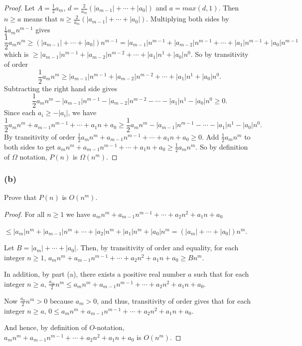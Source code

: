 \documentclass[14pt]{extarticle}
\newcommand{\dps}{\displaystyle}
\begin{document}
\begin{proof}
Let \(\dps A = \frac{1}{2}a_m\), \(\dps d = \frac{2}{a_m}(|a_{m-1}| + \cdots + |a_0|)\) and \(a = max(d, 1)\). Then 
\(n \geq a\) means that \(\dps n \geq \frac{2}{a_m}(|a_{m-1}| + \cdots + |a_0|)\). Multiplying both sides by \(\dps
\frac{1}{2}a_m n^{m-1}\) gives
\[
\frac{1}{2}a_m n^m \geq (|a_{m-1}| + \cdots + |a_0|)n^{m-1} = |a_{m-1}|n^{m-1} + |a_{m-2}|n^{m-1} + \cdots + |a_1|n^{m-1} +
|a_0|n^{m-1}
\]
which is \(\geq |a_{m-1}|n^{m-1} + |a_{m-2}|n^{m-2} + \cdots + |a_1|n^1 + |a_0|n^0\). So by transitivity of order
\[
\frac{1}{2}a_m n^m \geq |a_{m-1}|n^{m-1} + |a_{m-2}|n^{m-2} + \cdots + |a_1|n^1 + |a_0|n^0.
\]
Subtracting the right hand side gives
\[
\frac{1}{2}a_m n^m - |a_{m-1}|n^{m-1} - |a_{m-2}|n^{m-2} - \cdots - |a_1|n^1 - |a_0|n^0 \geq 0.
\]
Since each \(a_i \geq -|a_i|\), we have
\[
\frac{1}{2}a_m n^m + a_{m-1}n^{m-1} + \cdots + a_1n + a_0 \geq \frac{1}{2}a_m n^m - |a_{m-1}|n^{m-1} - \cdots - |a_1|n^1 - 
|a_0|n^0.
\]
By transitivity of order \(\frac{1}{2}a_m n^m + a_{m-1}n^{m-1} + \cdots + a_1n + a_0 \geq 0\). Add \(\frac{1}{2}a_mn^m\) to
both sides to get \(a_m n^m + a_{m-1}n^{m-1} + \cdots + a_1n + a_0 \geq \frac{1}{2}a_mn^m\). So by definition of \(\Omega\)
notation, \(P(n)\) is \(\Omega(n^m)\).
\end{proof}

\subsubsection{(b)}
Prove that \(P(n)\) is \(O(n^m)\).
\begin{proof}
For all \(n \geq 1\) we have \(a_mn^m + a_{m-1}n^{m-1} + \cdots + a_2n^2 + a_1n + a_0\) 

\(\leq |a_m|n^m + |a_{m-1}|n^m + \cdots + |a_2|n^m + |a_1|n^m + |a_0|n^m = (|a_m| + \cdots + |a_0|)n^m\).

Let \(B = |a_m| + \cdots + |a_0|\). Then, by transitivity of order and equality, for each integer \(n \geq 1\), \(a_mn^m + 
a_{m-1}n^{m-1} + \cdots + a_2n^2 + a_1n + a_0 \geq Bn^m\).

In addition, by part (a), there exists a positive real number \(a\) such that for each integer \(n \geq a\), \(\frac{a_m}{2}
n^m \leq a_mn^m + a_{m-1}n^{m-1} + \cdots + a_2n^2 + a_1n + a_0\).

Now \(\frac{a_n}{2} n^m > 0\) because \(a_m > 0\), and thus, transitivity of order gives that for each integer \(n\geq a\),
\(0 \leq a_mn^m + a_{m-1}n^{m-1} + \cdots + a_2n^2 + a_1n + a_0\).

And hence, by definition of \(O\)-notation, \(a_mn^m + a_{m-1}n^{m-1} + \cdots + a_2n^2 + a_1n + a_0\) is \(O(n^m)\).
\end{proof}
\end{document}
